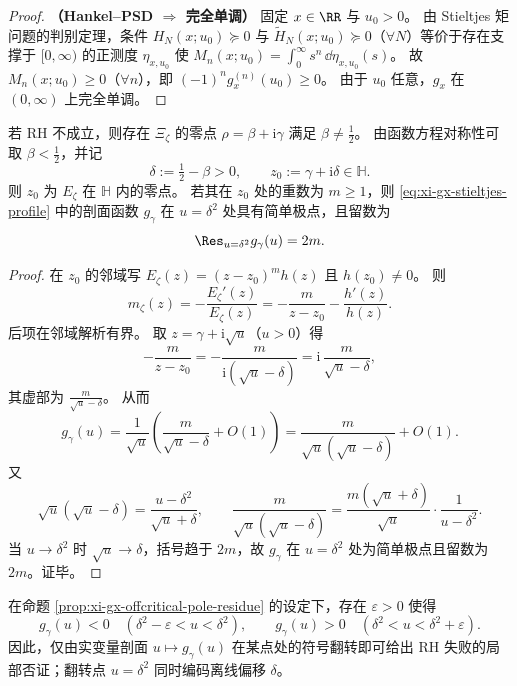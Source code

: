 \begin{proof}
\textbf{（Hankel--PSD \(\Rightarrow\) 完全单调）}
固定 \(x\in\RR\) 与 \(u_0>0\)。
由 Stieltjes 矩问题的判别定理，条件 \(H_N(x;u_0)\succeq 0\) 与 \(\widetilde H_N(x;u_0)\succeq 0\)（\(\forall N\)）等价于存在支撑于 \([0,\infty)\) 的正测度 \(\eta_{x,u_0}\) 使
\(
M_n(x;u_0)=\int_{0}^{\infty}s^n\,\dd\eta_{x,u_0}(s)
\)。
故 \(M_n(x;u_0)\ge 0\)（\(\forall n\)），即
\(
(-1)^n g_x^{(n)}(u_0)\ge 0
\)。
由于 \(u_0\) 任意，\(g_x\) 在 \((0,\infty)\) 上完全单调。
\end{proof}

\begin{proposition}\label{prop:xi-gx-offcritical-pole-residue}
若 RH 不成立，则存在 \(\Xi_{\zeta}\) 的零点 \(\rho=\beta+\mathrm{i}\gamma\) 满足 \(\beta\ne\tfrac12\)。
由函数方程对称性可取 \(\beta<\tfrac12\)，并记
\[
\delta:=\tfrac12-\beta>0,\qquad z_0:=\gamma+\mathrm{i}\delta\in\mathbb{H}.
\]
则 \(z_0\) 为 \(E_{\zeta}\) 在 \(\mathbb{H}\) 内的零点。
若其在 \(z_0\) 处的重数为 \(m\ge 1\)，则 \eqref{eq:xi-gx-stieltjes-profile} 中的剖面函数 \(g_{\gamma}\) 在 \(u=\delta^2\) 处具有简单极点，且留数为
\[
\Res_{u=\delta^2} g_{\gamma}(u)=2m.
\]
\end{proposition}

\begin{proof}
在 \(z_0\) 的邻域写
\(
E_{\zeta}(z)=(z-z_0)^m h(z)
\)
且 \(h(z_0)\ne 0\)。
则
\[
m_{\zeta}(z)=-\frac{E_{\zeta}'(z)}{E_{\zeta}(z)}
=-\frac{m}{z-z_0}-\frac{h'(z)}{h(z)}.
\]
后项在邻域解析有界。
取 \(z=\gamma+\mathrm{i}\sqrt{u}\)（\(u>0\)）得
\[
-\frac{m}{z-z_0}=-\frac{m}{\mathrm{i}(\sqrt{u}-\delta)}=\mathrm{i}\,\frac{m}{\sqrt{u}-\delta},
\]
其虚部为 \(\frac{m}{\sqrt{u}-\delta}\)。
从而
\[
g_{\gamma}(u)
=\frac{1}{\sqrt{u}}\left(\frac{m}{\sqrt{u}-\delta}+O(1)\right)
=\frac{m}{\sqrt{u}(\sqrt{u}-\delta)}+O(1).
\]
又
\[
\sqrt{u}(\sqrt{u}-\delta)=\frac{u-\delta^2}{\sqrt{u}+\delta},
\qquad
\frac{m}{\sqrt{u}(\sqrt{u}-\delta)}
=\frac{m(\sqrt{u}+\delta)}{\sqrt{u}}\cdot\frac{1}{u-\delta^2}.
\]
当 \(u\to\delta^2\) 时 \(\sqrt{u}\to\delta\)，括号趋于 \(2m\)，故 \(g_{\gamma}\) 在 \(u=\delta^2\) 处为简单极点且留数为 \(2m\)。证毕。
\end{proof}


\begin{corollary}\label{cor:xi-gx-local-sign-flip-falsifier}
在命题 \ref{prop:xi-gx-offcritical-pole-residue} 的设定下，存在 \(\varepsilon>0\) 使得
\[
g_{\gamma}(u)<0\quad(\delta^2-\varepsilon<u<\delta^2),
\qquad
g_{\gamma}(u)>0\quad(\delta^2<u<\delta^2+\varepsilon).
\]
因此，仅由实变量剖面 \(u\mapsto g_{\gamma}(u)\) 在某点处的符号翻转即可给出 RH 失败的局部否证；翻转点 \(u=\delta^2\) 同时编码离线偏移 \(\delta\)。
\end{corollary}

